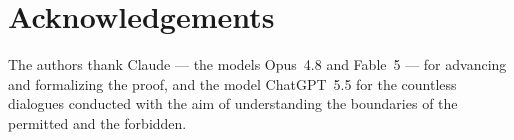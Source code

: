 \section*{Acknowledgements}

The authors thank Claude --- the models Opus~4.8 and Fable~5 --- for advancing and formalizing
the proof, and the model ChatGPT~5.5 for the countless dialogues conducted with the aim of
understanding the boundaries of the permitted and the forbidden.
